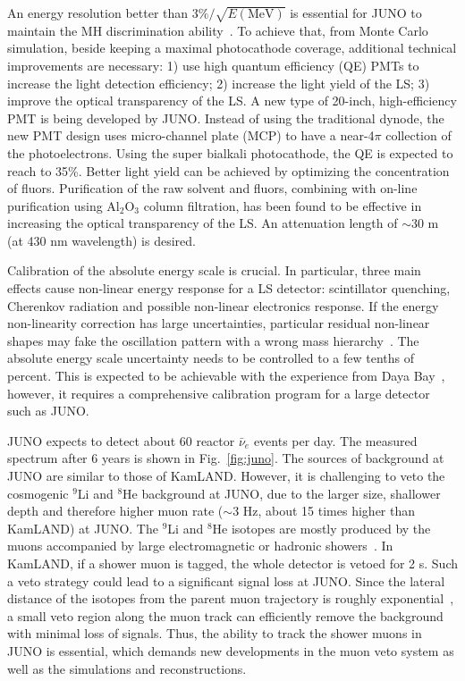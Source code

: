 An energy resolution better than $3\%/\sqrt{E(\textrm{MeV})}$ is essential for JUNO to maintain the MH discrimination ability~\cite{Li-PRD13}. 
To achieve that, from Monte Carlo simulation, beside keeping a maximal photocathode coverage, additional technical improvements are necessary: 
1) use high quantum efficiency (QE) PMTs to increase the light detection efficiency;
2) increase the light yield of the LS;
3) improve the optical transparency of the LS.
A new type of 20-inch, high-efficiency PMT is being developed by JUNO. Instead of using the traditional dynode, the new PMT design uses micro-channel plate (MCP) to have a near-4$\pi$ collection of the photoelectrons. 
Using the super bialkali photocathode, the QE is expected to reach to 35\%. 
Better light yield can be achieved by optimizing the concentration of fluors. 
Purification of the raw solvent and fluors, combining with on-line purification using Al$_2$O$_3$ column filtration, has been found to be effective in increasing the optical transparency of the LS. An attenuation length of $\sim$30 m (at 430 nm wavelength) is desired.

Calibration of the absolute energy scale is crucial. 
In particular, three main effects cause non-linear energy response for a LS detector: scintillator quenching, Cherenkov radiation and possible non-linear electronics response. 
If the energy non-linearity correction has large uncertainties, particular residual non-linear shapes may fake the oscillation pattern with a wrong mass hierarchy~\cite{Qian-PRD13}. 
The absolute energy scale uncertainty needs to be controlled to a few tenths of percent. 
This is expected to be achievable with the experience from Daya Bay~\cite{Zhang-Neutrino14}, however, it requires a comprehensive calibration program for a large detector such as JUNO.

JUNO expects to detect about 60 reactor $\bar\nu_e$ events per day. The measured spectrum after 6 years is shown in Fig.~\ref{fig:juno}.
The sources of background at JUNO are similar to those of KamLAND. 
However, it is challenging to veto the cosmogenic $^9$Li and $^8$He background at JUNO, due to the larger size, shallower depth and therefore higher muon rate ($\sim$3 Hz, about 15 times higher than KamLAND) at JUNO. 
The $^9$Li and $^8$He isotopes are mostly produced by the muons accompanied by large electromagnetic or hadronic showers~\cite{KamLAND-spall}. In KamLAND, if a shower muon is tagged, the whole detector is vetoed for 2 s. Such a veto strategy could lead to a significant signal loss at JUNO. 
Since the lateral distance of the isotopes from the parent muon trajectory is roughly exponential~\cite{KamLAND-spall}, a small veto region along the muon track can efficiently remove the background with minimal loss of signals. Thus, the ability to track the shower muons in JUNO is essential, which demands new developments in the muon veto system as well as the simulations and reconstructions.

